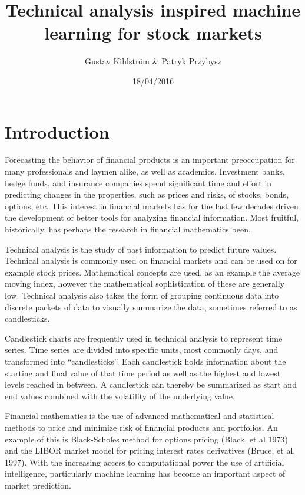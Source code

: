 \documentclass{article}
\begin{document}
\title{Technical analysis inspired machine learning for stock markets}
\author{Gustav Kihlström \& Patryk Przybysz}
\date{18/04/2016}
\maketitle
\newpage

\tableofcontents
\newpage

\section{Introduction}
Forecasting the behavior of financial products is an important preoccupation for many professionals and laymen alike, as well as academics. Investment banks, hedge funds, and insurance companies spend significant time and effort in predicting changes in the properties, such as prices and risks, of stocks, bonds, options, etc. This interest in financial markets has for the last few decades driven the development of better tools for analyzing financial information. Most fruitful, historically, has perhaps the research in financial mathematics been. 

Technical analysis is the study of past information to predict future values. Technical analysis is commonly used on financial markets and can be used on for example stock prices. Mathematical concepts are used, as an example the average moving index, however the mathematical sophistication of these are generally low. Technical analysis also takes the form of grouping continuous data into discrete packets of data to visually summarize the data, sometimes referred to as candlesticks.

Candlestick charts are frequently used in technical analysis to represent time series. Time series are divided into specific units, most commonly days, and transformed into “candlesticks”. Each candlestick holds information about the starting and final value of that time period as well as the highest and lowest levels reached in between. A candlestick can thereby be summarized as start and end values combined with the volatility of the underlying value.

Financial mathematics is the use of advanced mathematical and statistical methods to price and minimize risk of financial products and portfolios. An example of this is Black-Scholes method for options pricing (Black, et al 1973) and the LIBOR market model for pricing interest rates derivatives (Bruce, et al. 1997). With the increasing access to computational power the use of artificial intelligence, particularly machine learning has become an important aspect of market prediction. 
\end{document}
